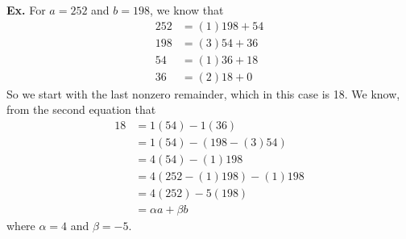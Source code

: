 \documentclass[class=article, crop=false]{standalone}
\begin{document}
\textbf{Ex.} For $a=252$ and $b=198$, we know that
\begin{align*}
	252 &= (1)198 + 54\\
	198 &= (3)54 + 36\\
	54 &= (1)36 + 18\\
	36 &= (2)18 + 0
\end{align*}
So we start with the last nonzero remainder, which in this case is 18. We know, from the second equation that
\begin{align*}
	18 &= 1(54) - 1(36) \\
	&= 1(54) - (198-(3)54) \\
	&= 4(54) - (1)198 \\
	&= 4(252-(1)198)- (1)198 \\
	&= 4(252) - 5(198) \\
	&= \alpha a + \beta b
\end{align*}
where $\alpha = 4$ and $\beta = -5$.
\end{document}
